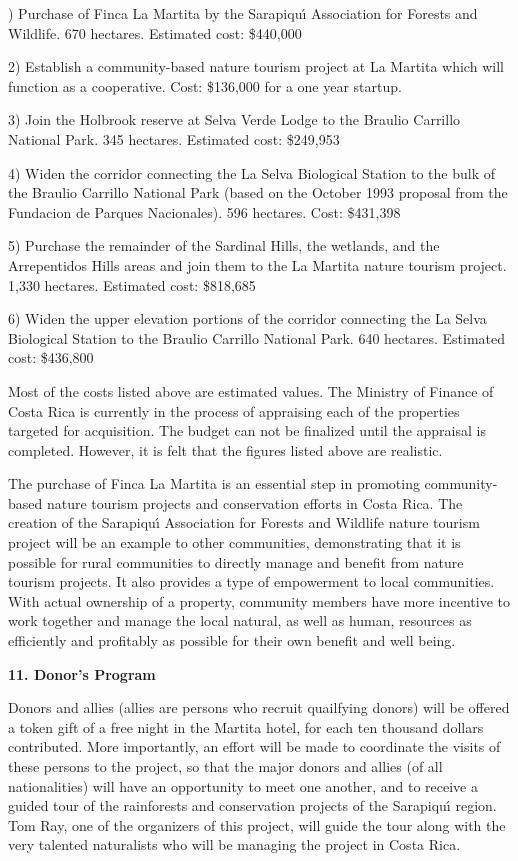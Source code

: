 )   Purchase of Finca La Martita by the Sarapiqu\'{\i} Association
     for Forests and Wildlife.  670 hectares.  Estimated cost: \$440,000

2)   Establish a community-based nature tourism project at La Martita
     which will function as a cooperative.
     Cost: \$136,000 for a one year startup.

3)   Join the Holbrook reserve at Selva Verde Lodge to the Braulio
     Carrillo National Park.  345 hectares.  Estimated cost: \$249,953

4)   Widen the corridor connecting the La Selva Biological Station
     to the bulk of the Braulio Carrillo National Park (based on the
     October 1993 proposal from the Fundacion de Parques Nacionales).
     596 hectares.  Cost: \$431,398

5)   Purchase the remainder of the Sardinal Hills, the wetlands, and
     the Arrepentidos Hills areas and join them to the La Martita
     nature tourism project.  1,330 hectares.  Estimated cost: \$818,685

6)   Widen the upper elevation portions of the corridor connecting the
     La Selva Biological Station to the Braulio Carrillo National Park.
     640 hectares.  Estimated cost: \$436,800
\eXPNS

Most of the costs listed above are estimated values.  The Ministry of
Finance of Costa Rica is currently in the process of appraising each of
the properties targeted for acquisition.  The budget can not be finalized
until the appraisal is completed.  However, it is felt that the figures
listed above are realistic.

The purchase of Finca La Martita is an essential step in promoting
community-based nature tourism projects and conservation efforts in
Costa Rica.  The creation of the Sarapiqu\'{\i} Association for Forests
and Wildlife nature tourism project will be an example to other
communities, demonstrating that it is possible for rural communities to
directly manage and benefit from nature tourism projects.  It also
provides a type of empowerment to local communities.  With actual
ownership of a property, community members have more incentive to
work together and manage the local natural, as well as human, resources
as efficiently and profitably as possible for their own benefit and
well being.

\LP
{\large {\bf 11.  Donor's Program}}
\eLP

Donors and allies (allies are persons who recruit quailfying donors)
will be offered a token gift of a free night in the Martita hotel, for
each ten thousand dollars contributed.  More importantly, an effort
will be made to coordinate the visits of these persons to the project,
so that the major donors and allies (of all nationalities) will have
an opportunity to meet one another, and to receive a guided tour of
the rainforests and conservation projects of the Sarapiqu\'{\i} region.
Tom Ray, one of the organizers of this project, will guide the tour
along with the very talented naturalists who will be managing the
project in Costa Rica.

